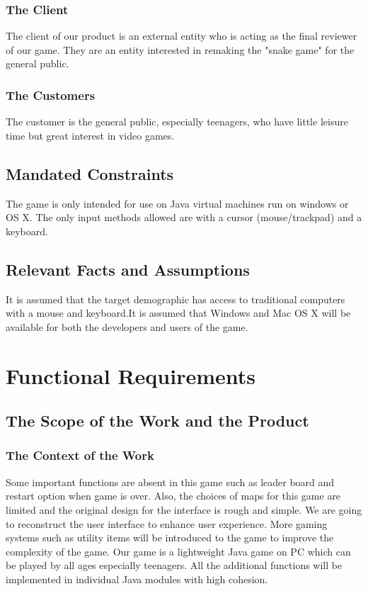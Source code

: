 \documentclass[12pt, titlepage]{article}
\begin{document}
\subsubsection{The Client}
The client of our product is an external entity who is acting as the final reviewer of our game. They are an entity interested in remaking the "snake game" for the general public.

\subsubsection{The Customers}
The customer is the general public, especially teenagers, who have little leisure time but great interest in video games.

\subsection{Mandated Constraints}
The game is only intended for use on Java virtual machines run on windows or OS X.
The only input methods allowed are with a cursor (mouse/trackpad) and a keyboard.

\subsection{Relevant Facts and Assumptions}
It is assumed that the target demographic has access to traditional computers with a mouse and keyboard.It is assumed that Windows and Mac OS X will be available for both the developers and users of the game.

\section{Functional Requirements}

\subsection{The Scope of the Work and the Product}

\subsubsection{The Context of the Work}
Some important functions are absent in this game such as leader board and restart option when game is over. Also, the choices of maps for this game are limited and the original design for the interface is rough and simple. We are going to reconstruct the user interface to enhance user experience. More gaming systems such as utility items will be introduced to the game to improve the complexity of the game. Our game is a lightweight Java game on PC which can be played by all ages especially teenagers. All the additional functions will be implemented in individual Java modules with high cohesion.
\end{document}
